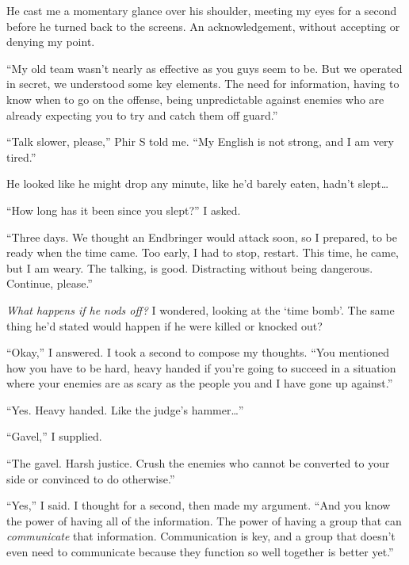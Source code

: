 He cast me a momentary glance over his shoulder, meeting my eyes for a second before he turned back to the screens.  An acknowledgement, without accepting or denying my point.



``My old team wasn't nearly as effective as you guys seem to be.  But we operated in secret, we understood some key elements.  The need for information, having to know when to go on the offense, being unpredictable against enemies who are already expecting you to try and catch them off guard.''



``Talk slower, please,'' Phir S told me.  ``My English is not strong, and I am very tired.''



He looked like he might drop any minute, like he'd barely eaten, hadn't slept\ldots



``How long has it been since you slept?''  I asked.



``Three days.  We thought an Endbringer would attack soon, so I prepared, to be ready when the time came.  Too early, I had to stop, restart.  This time, he came, but I am weary.  The talking, is good.  Distracting without being dangerous.  Continue, please.''



\emph{What happens if he nods off?}  I wondered, looking at the `time bomb'.  The same thing he'd stated would happen if he were killed or knocked out?



``Okay,'' I answered.  I took a second to compose my thoughts.  ``You mentioned how you have to be hard, heavy handed if you're going to succeed in a situation where your enemies are as scary as the people you and I have gone up against.''



``Yes.  Heavy handed.  Like the judge's hammer\ldots''



``Gavel,'' I supplied.



``The gavel.  Harsh justice.  Crush the enemies who cannot be converted to your side or convinced to do otherwise.''



``Yes,'' I said.  I thought for a second, then made my argument.  ``And you know the power of having all of the information.  The power of having a group that can \emph{communicate} that information.  Communication is key, and a group that doesn't even need to communicate because they function so well together is better yet.''



